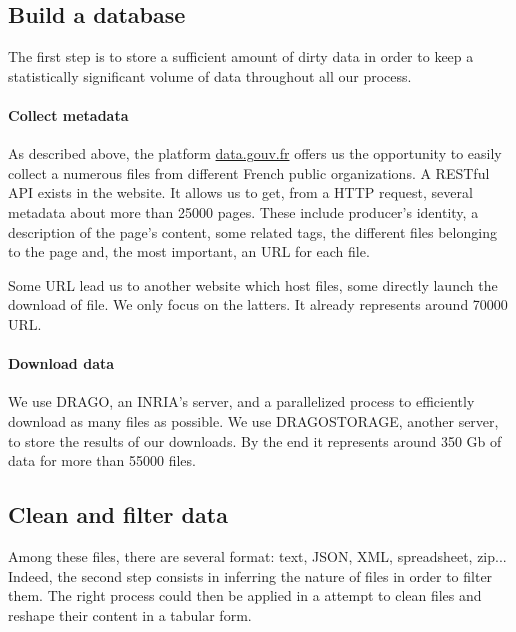 \documentclass[a4paper]{article}
\begin{document}
	
	\subsection{Build a database}
	
	The first step is to store a sufficient amount of dirty data in order to keep a statistically significant volume of data throughout all our process.
	
	\paragraph{Collect metadata}
	
	As described above, the platform \href{http://www.data.gouv.fr/fr/}{data.gouv.fr} offers us the opportunity to easily collect a numerous files from different French public organizations. A RESTful API exists in the website. It allows us to get, from a HTTP request, several metadata about more than 25000 pages. These include producer's identity, a description of the page's content, some related tags, the different files belonging to the page and, the most important, an URL for each file. 
	
	Some URL lead us to another website which host files, some directly launch the download of file. We only focus on the latters. It already represents around 70000 URL.
	
	\paragraph{Download data}
	
	We use DRAGO, an INRIA's server, and a parallelized process to efficiently download as many files as possible. We use DRAGOSTORAGE, another server, to store the results of our downloads. By the end it represents around 350 Gb of data for more than 55000 files.
	
	\subsection{Clean and filter data}
	
	Among these files, there are several format: text, JSON, XML, spreadsheet, zip... Indeed, the second step consists in inferring the nature of files in order to filter them. The right process could then be applied in a attempt to clean files and reshape their content in a tabular form.
	
\end{document}
